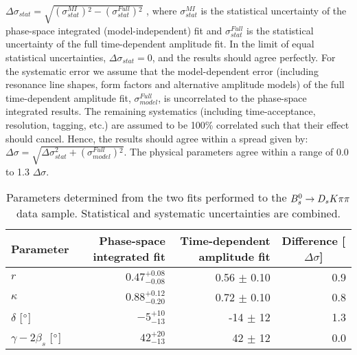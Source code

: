 $\Delta \sigma_{stat} = \sqrt{ (\sigma^{MI}_{stat}){}^2- (\sigma^{Full}_{stat}){}^2}$ ,
where $\sigma^{MI}_{stat}$ is the statistical uncertainty of the phase-space integrated (model-independent) fit 
and $\sigma^{Full}_{stat}$ is the statistical uncertainty of the full time-dependent amplitude fit.
In the limit of equal statistical uncertainties, $\Delta \sigma_{stat} = 0$,  and the results should agree perfectly.
For the systematic error we assume that the model-dependent error (including resonance line shapes, form factors and alternative amplitude models) of the full time-dependent amplitude fit, 
$\sigma^{Full}_{model}$, is uncorrelated 
to the phase-space integrated results.
The remaining systematics (including time-acceptance, resolution, tagging, etc.) are assumed to be 100\% correlated such that their effect should cancel.
Hence, the results should agree within a spread given by:
$\Delta \sigma = \sqrt{ \Delta \sigma_{stat}^2 + (\sigma^{Full}_{model}){}^2}$.
The physical parameters agree within a range of 0.0 to 1.3 $\Delta \sigma$. 


\begin{table}[h]
\centering
\caption{Parameters determined from the two fits performed to the ${{B}^0_{s}}\rightarrow{\ensuremath{{D}_{s}}}{\ensuremath{K}}{\ensuremath{\pi}}{\ensuremath{\pi}}$ data sample. 
 Statistical and systematic uncertainties are combined.}
\begin{tabular}{l r r r }
\hline
\hline
Parameter & Phase-space integrated fit & Time-dependent amplitude fit &\multicolumn{1}{c}{ Difference [$\Delta\sigma$]} \\
\hline
$r$ & $0.47^{+0.08}_{-0.08}$  & 0.56 $\pm$ 0.10 & 0.9 \\
$\kappa$ & $0.88^{+0.12}_{-0.20}$  & 0.72 $\pm$ 0.10 & 0.8\\
$\delta$ [$^{\circ}$] &  $-5^{+10}_{-13}$ & -14 $\pm$ 12 & 1.3\\
$\gamma - 2 \beta_s$ [$^{\circ}$] & $42^{+20}_{-13} $ & 42 $\pm$ 12 & 0.0\\
\hline
\hline
\end{tabular}
\label{tab:ResultSummary}
\end{table}

